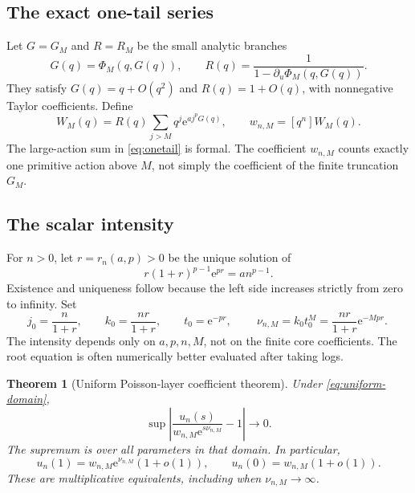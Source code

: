 \documentclass[11pt,a4paper]{article}
\numberwithin{equation}{section}
\newtheorem{theorem}{Theorem}[section]
\theoremstyle{definition}
\theoremstyle{remark}
\newcommand{\ee}{\mathrm e}\newcommand{\dd}{\mathrm d}
\begin{document}
\subsection{The exact one-tail series}
Let $G=G_M$ and $R=R_M$ be the small analytic branches
\begin{equation}
 G(q)=\Phi_M(q,G(q)),\qquad
 R(q)=\frac{1}{1-\partial_u\Phi_M(q,G(q))}.
 \label{eq:core}
\end{equation}
They satisfy $G(q)=q+O(q^2)$ and $R(q)=1+O(q)$, with nonnegative
Taylor coefficients. Define
\begin{equation}
 W_M(q)=R(q)\sum_{j>M}q^j\ee^{a j^pG(q)},\qquad
 w_{n,M}=[q^n]W_M(q).
 \label{eq:onetail}
\end{equation}
The large-action sum in \eqref{eq:onetail} is formal. The coefficient
$w_{n,M}$ counts exactly one primitive action above $M$, not simply the
coefficient of the finite truncation $G_M$.

\subsection{The scalar intensity}
For $n>0$, let $r=r_n(a,p)>0$ be the unique solution of
\begin{equation}
 r(1+r)^{p-1}\ee^{pr}=a n^{p-1}.
 \label{eq:r}
\end{equation}
Existence and uniqueness follow because the left side increases strictly
from zero to infinity. Set
\begin{equation}
 j_0=\frac{n}{1+r},\qquad k_0=\frac{nr}{1+r},\qquad
 t_0=\ee^{-pr},\qquad
 \boxed{\ \nu_{n,M}=k_0t_0^M=\frac{nr}{1+r}\ee^{-Mp r}.\ }
 \label{eq:nu}
\end{equation}
The intensity depends only on $a,p,n,M$, not on the finite core coefficients.
The root equation is often numerically better evaluated after taking logs.

\begin{theorem}[Uniform Poisson-layer coefficient theorem]
\label{thm:main}
Under \eqref{eq:uniform-domain},
\begin{equation}
 \boxed{\quad
 \sup\left|\frac{u_n(s)}{w_{n,M}\ee^{s\nu_{n,M}}}-1\right|
 \longrightarrow0.
 \quad}
 \label{eq:main}
\end{equation}
The supremum is over all parameters in that domain. In particular,
\begin{equation}
 u_n(1)=w_{n,M}\ee^{\nu_{n,M}}(1+o(1)),\qquad
 u_n(0)=w_{n,M}(1+o(1)).
 \label{eq:repair}
\end{equation}
These are multiplicative equivalents, including when $\nu_{n,M}\to\infty$.
\end{theorem}
\end{document}
